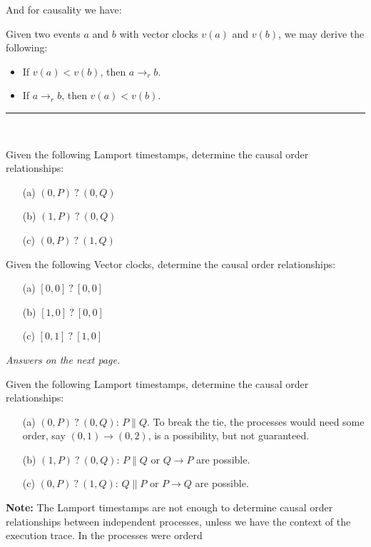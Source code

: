 \noindent
And for causality we have:
\begin{theo}

    Given two events $a$ and $b$ with vector clocks $v(a)$ and $v(b)$, we may derive the following:
    \begin{itemize}
        \item If $v(a) < v(b)$, then $a \rightarrow_r b$.
        \item If $a \rightarrow_r b$, then $v(a) < v(b)$.
    \end{itemize}
\end{theo}

\noindent
\rule{\textwidth}{0.4pt}\\

\begin{Exercise} Given the following Lamport timestamps, determine the causal order relationships:

    \begin{itemize}
        \item[(a)] $(0,P)\ ?\ (0,Q)$
        \item[(b)] $(1,P)\ ?\ (0,Q)$
        \item[(c)] $(0,P)\ ?\ (1,Q)$
    \end{itemize}
\end{Exercise}

\begin{Exercise} Given the following Vector clocks, determine the causal order relationships:

    \begin{itemize}
        \item[(a)] $[0,0]\ ?\ [0,0]$
        \item[(b)] $[1,0]\ ?\ [0,0]$
        \item[(c)] $[0,1]\ ?\ [1,0]$
    \end{itemize}
\end{Exercise}

\hfill \textit{Answers on the next page.}\hfill \null

\newpage 

\begin{Answer} Given the following Lamport timestamps, determine the causal order relationships:

    \begin{itemize}
        \item[(a)] $(0,P)\ ?\ (0,Q)$: $P \parallel Q$. To break the tie, the processes would need some order, say $(0,1)\rightarrow(0,2)$, is a possibility, but not guaranteed.
        \item[(b)] $(1,P)\ ?\ (0,Q)$: $P \parallel Q$ or $Q \rightarrow P$ are possible.
        \item[(c)] $(0,P)\ ?\ (1,Q)$: $Q \parallel P$ or $P \rightarrow Q$ are possible.
    \end{itemize}

    \noindent
    \textbf{Note:} The Lamport timestamps are not enough to determine causal order relationships between independent processes, unless 
    we have the context of the execution trace. In the processes were orderd
\end{Answer}

